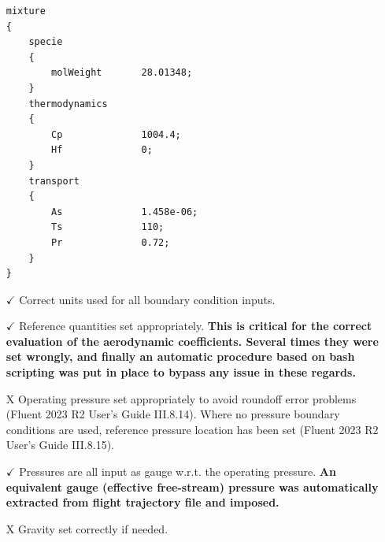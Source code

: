 \documentclass[12pt]{article}
\begin{document}
\begin{itemize}
\begin{lstlisting}
mixture
{
    specie
    {
        molWeight       28.01348;
    }
    thermodynamics
    {
        Cp              1004.4;
        Hf              0;
    }
    transport
    {
        As              1.458e-06;
        Ts              110;
        Pr              0.72;
    }
}
    \end{lstlisting}
    \item[$\checkmark$] Correct units used for all boundary condition inputs.
    \item[$\checkmark$] Reference quantities set appropriately.
    \textbf{This is critical for the correct evaluation of the aerodynamic coefficients. Several times they were set wrongly, and finally an automatic procedure based on bash scripting was put in place to bypass any issue in these regards.}
    \item[X] Operating pressure set appropriately to avoid roundoff error problems (Fluent 2023 R2 User's Guide III.8.14). Where no pressure boundary conditions are used, reference pressure location has been set (Fluent 2023 R2 User's Guide III.8.15).
    \item[$\checkmark$] Pressures are all input as gauge w.r.t. the operating pressure.
    \textbf{An equivalent gauge (effective free-stream) pressure was automatically extracted from flight trajectory file and imposed.}
    \item[X] Gravity set correctly if needed.
\end{itemize}
\end{document}
